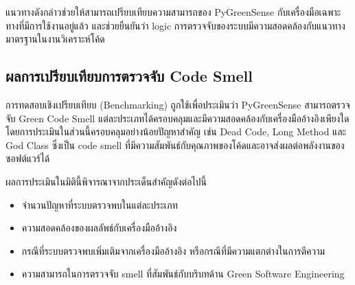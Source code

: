 แนวทางดังกล่าวช่วยให้สามารถเปรียบเทียบความสามารถของ {\boldfont PyGreenSense} กับเครื่องมือเฉพาะทางที่มีการใช้งานอยู่แล้ว และช่วยยืนยันว่า {\italicfont logic} การตรวจจับของระบบมีความสอดคล้องกับแนวทางมาตรฐานในงานวิเคราะห์โค้ด

\subsection{ผลการเปรียบเทียบการตรวจจับ Code Smell}

การทดสอบเชิงเปรียบเทียบ ({\boldfont Benchmarking}) ถูกใช้เพื่อประเมินว่า {\boldfont PyGreenSense} สามารถตรวจจับ {\italicfont Green Code Smell} แต่ละประเภทได้ครอบคลุมและมีความสอดคล้องกับเครื่องมืออ้างอิงเพียงใด โดยการประเมินในส่วนนี้ครอบคลุมอย่างน้อยปัญหาสำคัญ เช่น {\boldfont Dead Code}, {\boldfont Long Method} และ {\boldfont God Class} ซึ่งเป็น {\italicfont code smell} ที่มีความสัมพันธ์กับคุณภาพของโค้ดและอาจส่งผลต่อพลังงานของซอฟต์แวร์ได้ \cite{verdecchia2018energy}

ผลการประเมินในมิตินี้พิจารณาจากประเด็นสำคัญดังต่อไปนี้

\begin{itemize}
    \item จำนวนปัญหาที่ระบบตรวจพบในแต่ละประเภท
    \item ความสอดคล้องของผลลัพธ์กับเครื่องมืออ้างอิง
    \item กรณีที่ระบบตรวจพบเพิ่มเติมจากเครื่องมืออ้างอิง หรือกรณีที่มีความแตกต่างในการตีความ
    \item ความสามารถในการตรวจจับ {\italicfont smell} ที่สัมพันธ์กับบริบทด้าน {\italicfont Green Software Engineering}
\end{itemize}

